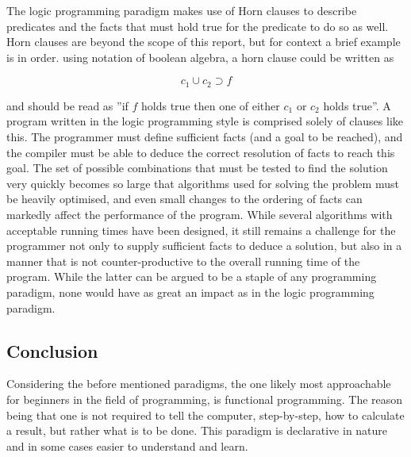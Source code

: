 The logic programming paradigm makes use of Horn clauses to describe predicates and the facts that must hold true for the predicate to do so as well. Horn clauses are beyond the scope of this report, but for context a brief example is in order. using notation of boolean algebra, a horn clause could be written as 

\[
c_1 \cup c_2 \supset f
\]

and should be read as ''if $f$ holds true then one of either $c_1$ or $c_2$ holds true''. A program written in the logic programming style is comprised solely of clauses like this. The programmer must define sufficient facts (and a goal to be reached), and the compiler must be able to deduce the correct resolution of facts to reach this goal. The set of possible combinations that must be tested to find the solution very quickly becomes so large that algorithms used for solving the problem must be heavily optimised, and even small changes to the ordering of facts can markedly affect the performance of the program. While several algorithms with acceptable running times have been designed, it still remains a challenge for the programmer not only to supply sufficient facts to deduce a solution, but also in a manner that is not counter-productive to the overall running time of the program. While the latter can be argued to be a staple of any programming paradigm, none would have as great an impact as in the logic programming paradigm.

\subsection{Conclusion}
Considering the before mentioned paradigms, the one likely most approachable for beginners in the field of programming, is functional programming. The reason being that one is not required to tell the computer, step-by-step, how to calculate a result, but rather what is to be done. This paradigm is declarative in nature and in some cases easier to understand and learn.